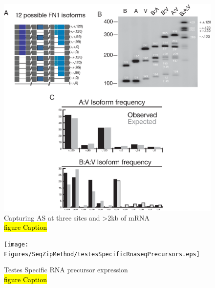   \begin{figure} %
    \centering 
    \includegraphics{Figures/SeqZipMethod/fn1ThreeSite.eps}
    \caption[Three sites of AS in \fn{} by SeqZip]
    {
      Capturing AS at three sites and >2kb of mRNA\\[0.25cm]
      \hl{figure Caption}
	    }
    \label{SeqZipMethod:fig:Hiv tx via SeqZip}
  	\end{figure}

  \begin{figure} %
    \centering 
    \texttt{[image: Figures/SeqZipMethod/testesSpecificRnaseqPrecursors.eps]}
    \caption[Testes Specific RNA precursor expression]
    {
      Testes Specific RNA precursor expression\\[0.25cm]
      \hl{figure Caption}
    	}
    \label{SeqZipMethod:fig:Hiv tx via SeqZip}
  	\end{figure}


